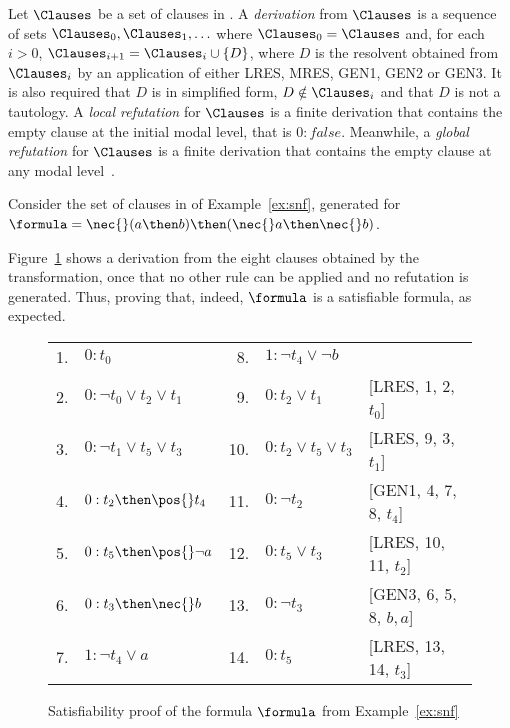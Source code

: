 \begin{definition}
    Let $\Clauses$ be a set of clauses in . A \emph{derivation} from
    $\Clauses$ is a sequence of sets $\Clauses_0, \Clauses_1, \ldots$ where
    $\Clauses_0 = \Clauses$ and, for each $i > 0$, $\Clauses_{i+1} = \Clauses_i
    \cup \{D\}$, where $D$ is the resolvent obtained from $\Clauses_i$ by an
    application of either LRES, MRES, GEN1, GEN2 or GEN3. It is also required
    that $D$ is in simplified form, $D \notin \Clauses_i$ and that $D$ is not a
    tautology. A \emph{local refutation} for $\Clauses$ is a finite derivation
    that contains the empty clause at the initial modal level, that is $0:
    false$. Meanwhile, a \emph{global refutation} for
    $\Clauses$ is a finite derivation that contains the empty clause at any
    modal level~\cite{nalon2015modal}.
\end{definition}



\begin{example}%
    \label{ex:calcsat}
    Consider the set of clauses in  of Example~\ref{ex:snf}, generated
    for $\formula = \nec{}(a \then b) \then (\nec{} a \then \nec{}b)$.

    Figure~\ref{tab:calcsat} shows a derivation from the eight
    clauses obtained by the transformation, once that no other rule can be
    applied and no refutation is generated. Thus, proving that, indeed,
    $\formula$ is a satisfiable formula, as expected.

    \begin{figure}[h!]%
        \centering%
        \begin{tabular}{rlrll}
            1. & $0 : t_0$                        & 8. & $1 : \neg t_4 \lor \neg b$   & \\
            2. & $0 : \neg t_0 \lor t_2 \lor t_1$ & 9.  & $0 : t_2 \lor t_1$          & [LRES, 1, 2, $t_0$]\\ 
            3. & $0 : \neg t_1 \lor t_5 \lor t_3$ & 10. & $0 : t_2 \lor t_5 \lor t_3$ & [LRES, 9, 3, $t_1$]\\ 
            4. & $0 : t_2 \then \pos {}t_4$       & 11. & $0 : \neg t_2$              & [GEN1, 4, 7, 8, $t_4$]\\
            5. & $0 : t_5 \then \pos{} \neg a$    & 12. & $0 : t_5 \lor t_3$          & [LRES, 10, 11, $t_2$]\\ 
            6. & $0 : t_3 \then \nec{} b$         & 13. & $0 : \neg t_3$              & [GEN3, 6, 5, 8, $b, a$]\\
            7. & $1 : \neg t_4 \lor a$            & 14. & $0 : t_5$                   & [LRES, 13, 14, $t_3$] \\
       \end{tabular}%
        \caption{Satisfiability proof of the formula $\formula$ from Example~\ref{ex:snf}}%
        \label{tab:calcsat}
    \end{figure}
\end{example}

